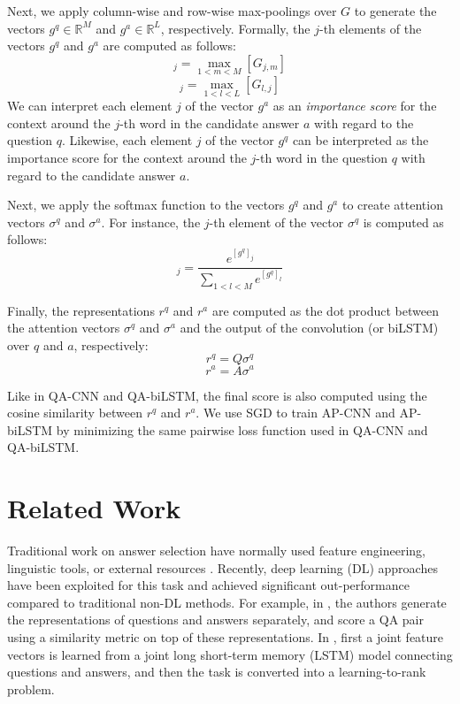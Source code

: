 \documentclass{article}
\begin{document}
Next, 
we apply column-wise and row-wise max-poolings over $G$ to generate the vectors $g^q \in \mathbb{R}^{M}$ and $g^a \in \mathbb{R}^{L}$, 
respectively.
Formally, 
the $j$-th elements of the vectors $g^q$ and $g^a$ are computed as follows:
\begin{equation}
[g^{q}]_j =\max_{1 < m < M}\left[G_{j,m}\right]
\end{equation}
\begin{equation}
[g^{a}]_j =\max_{1 < l < L}\left[G_{l,j}\right]
\end{equation}
We can interpret each element $j$ of the vector $g^a$ as an \emph{importance score} for the context around the $j$-th word in the candidate answer $a$ with regard to the question $q$.
Likewise,
each element $j$ of the vector $g^q$ can be interpreted as the importance score for the context around the $j$-th word in the question $q$ with regard to the candidate answer $a$.

Next, 
we apply the softmax function to the vectors $g^q$ and $g^a$ to create attention vectors $\sigma^{q}$ and $\sigma^{a}$.
For instance, 
the $j$-th element of the vector $\sigma^{q}$ is computed as follows:
\begin{equation}
[\sigma^{q}]_j = \dfrac{e^{[g^{q}]_j}}{\displaystyle \sum_{1 < l < M}{e^{[g^{q}]_l}}}
\end{equation}

Finally,
the representations $r^q$ and $r^a$ are computed as the dot product between the attention vectors $\sigma^{q}$ and $\sigma^{a}$ and the output of the convolution (or biLSTM) over $q$ and $a$, respectively:
\begin{equation} \label{sigmaq}
r^q=Q\sigma^{q}
\end{equation}
\begin{equation} \label{sigmaa}
r^a=A\sigma^{a}
\end{equation}

Like in QA-CNN and QA-biLSTM,
the final score is also computed using the cosine similarity between $r^q$ and $r^a$.
We use SGD to train AP-CNN and AP-biLSTM by minimizing the same pairwise loss function used in QA-CNN and QA-biLSTM.
 \section{Related Work}
\label{related_work}
Traditional work on answer selection have normally used feature engineering, 
linguistic tools, 
or external
resources \cite{yih2013,wangmengqiu2010,wangmengqiu2007}. Recently,
deep learning (DL) approaches have been  exploited for this task and achieved significant out-performance compared to traditional non-DL methods. For example, in \cite{yu2014,feng2015applying,severyn2015}, the authors generate the representations of questions and answers separately, and score a QA pair using a similarity metric on top of these representations. In \citet{wang2015},
first a joint feature vectors is learned from a joint long short-term memory (LSTM) model connecting questions and answers, 
and then the task is converted into a learning-to-rank problem. 
\end{document}
